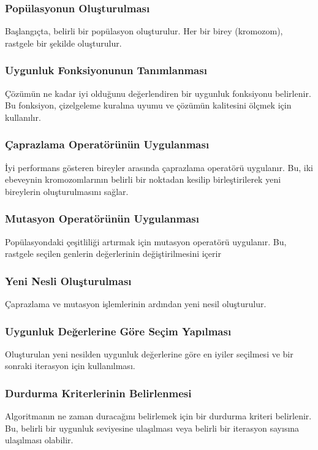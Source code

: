 \documentclass[12pt, a4paper]{article}
\begin{document}
\begin{flushleft}
		\subsubsection{Popülasyonun Oluşturulması}
		 Başlangıçta, belirli bir popülasyon oluşturulur. Her bir birey (kromozom), rastgele bir şekilde oluşturulur.\\[5pt]
		\subsubsection{Uygunluk Fonksiyonunun Tanımlanması}
		Çözümün ne kadar iyi olduğunu değerlendiren bir uygunluk fonksiyonu belirlenir. Bu fonksiyon, çizelgeleme kuralına uyumu ve çözümün kalitesini ölçmek için kullanılır.\\[5pt]
		\subsubsection{Çaprazlama Operatörünün Uygulanması}
		İyi performans gösteren bireyler arasında çaprazlama operatörü uygulanır. Bu, iki ebeveynin kromozomlarının belirli bir noktadan kesilip birleştirilerek yeni bireylerin oluşturulmasını sağlar.\\[5pt]
		\subsubsection{Mutasyon Operatörünün Uygulanması}
		Popülasyondaki çeşitliliği artırmak için mutasyon operatörü uygulanır. Bu, rastgele seçilen genlerin değerlerinin değiştirilmesini içerir
		\subsubsection{Yeni Nesli Oluşturulması}
		Çaprazlama ve mutasyon işlemlerinin ardından yeni nesil oluşturulur.\\
		\subsubsection{Uygunluk Değerlerine Göre Seçim Yapılması}
		Oluşturulan yeni nesilden uygunluk değerlerine göre en iyiler seçilmesi ve bir sonraki iterasyon için kullanılması.
		
		\subsubsection{Durdurma Kriterlerinin Belirlenmesi}
		Algoritmanın ne zaman duracağını belirlemek için bir durdurma kriteri belirlenir. Bu, belirli bir uygunluk seviyesine ulaşılması veya belirli bir iterasyon sayısına ulaşılması olabilir.

\end{flushleft}
\end{document}
